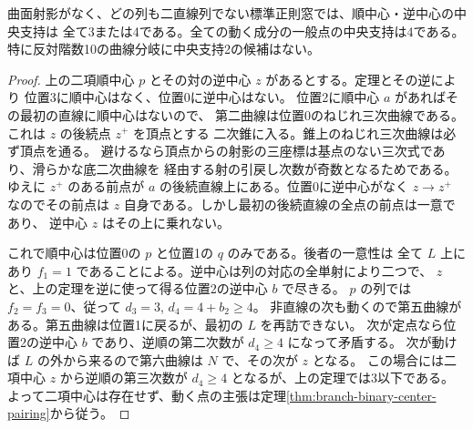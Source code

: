 \begin{corollary}\label{cor:no-binary-centers-without-two-lines}
曲面射影がなく、どの列も二直線列でない標準正則窓では、順中心・逆中心の中央支持は
全て3または4である。全ての動く成分の一般点の中央支持は4である。
特に反対階数10の曲線分岐に中央支持2の候補はない。
\end{corollary}
\begin{proof}
上の二項順中心 $p$ とその対の逆中心 $z$ があるとする。定理とその逆により
位置3に順中心はなく、位置0に逆中心はない。
位置2に順中心 $a$ があればその最初の直線に順中心はないので、
第二曲線は位置0のねじれ三次曲線である。これは $z$ の後続点 $z^+$ を頂点とする
二次錐に入る。錐上のねじれ三次曲線は必ず頂点を通る。
避けるなら頂点からの射影の三座標は基点のない三次式であり、滑らかな底二次曲線を
経由する射の引戻し次数が奇数となるためである。
ゆえに $z^+$ のある前点が $a$ の後続直線上にある。位置0に逆中心がなく
$z\to z^+$ なのでその前点は $z$ 自身である。しかし最初の後続直線の全点の前点は一意であり、
逆中心 $z$ はその上に乗れない。

これで順中心は位置0の $p$ と位置1の $q$ のみである。後者の一意性は
全て $L$ 上にあり $f_1=1$ であることによる。逆中心は列の対応の全単射により二つで、
$z$ と、上の定理を逆に使って得る位置2の逆中心 $b$ で尽きる。
$p$ の列では $f_2=f_3=0$、従って $d_3=3$, $d_4=4+b_2\ge4$。
非直線の次も動くので第五曲線がある。第五曲線は位置1に戻るが、最初の $L$ を再訪できない。
次が定点なら位置2の逆中心 $b$ であり、逆順の第二次数が $d_4\ge4$ になって矛盾する。
次が動けば $L$ の外から来るので第六曲線は $N$ で、その次が $z$ となる。
この場合には二項中心 $z$ から逆順の第三次数が $d_4\ge4$ となるが、上の定理では3以下である。
よって二項中心は存在せず、動く点の主張は定理\ref{thm:branch-binary-center-pairing}から従う。
\end{proof}
